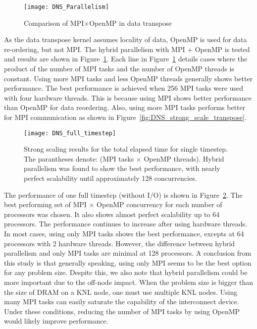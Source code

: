 \begin{figure}
 \begin{center}
   \texttt{[image: DNS\_Parallelism]}
   \caption{Comparison of MPI$\times$OpenMP in data transpose}
   \label{fig:DNS_MPI_OpenMP}
 \end{center}
\end{figure}


As the data transpose kernel assumes locality of data, OpenMP is used
for data re-ordering, but not MPI. The hybrid parallelism with MPI + OpenMP
is tested and results are shown in Figure~\ref{fig:DNS_MPI_OpenMP}. 
Each line in Figure~\ref{fig:DNS_MPI_OpenMP} details cases where the product of
the number of MPI tasks and the number of OpenMP threads is
constant. Using more MPI tasks and less OpenMP threads generally shows
better performance. The best performance is achieved when 256 MPI tasks
were used with four hardware threads. This is because using MPI shows
better performance than OpenMP for data reordering. Also, using more MPI
tasks performs better for MPI communication as shown in
Figure~\ref{fig:DNS_strong_scale_transpose}. 


\begin{figure}
 \begin{center}
   \texttt{[image: DNS\_full\_timestep]}
   \caption{Strong scaling results for the total elapsed time for single timestep. The parantheses denote: (MPI tasks $\times$ OpenMP threads). Hybrid parallelism was found to show the best performance, with nearly perfect scalability until approximately 128 concurrencies.}
   \label{fig:DNS_strong_scale_total_elapsed_time}
 \end{center}
\end{figure}

The performance of one full timestep (without I/O) is shown in
Figure~\ref{fig:DNS_strong_scale_total_elapsed_time}. The best
performing set of MPI $\times$ OpenMP concurrency for each number of 
processors was chosen. It also shows almost perfect scalability up to 64
processors. The performance continues to increase after using hardware
threads. In most cases, using only MPI tasks shows the best performance, 
excepts at 64 processors with 2 hardware threads. However, the
difference between hybrid parallelism and only MPI tasks are minimal at
128 processors. A conclusion from this study is that generally speaking, 
using only MPI seems to be the best option for any problem size. 
Despite this, we also note that hybrid parallelism could be more 
important due to the off-node impact. When the problem size
is bigger than the size of DRAM on a KNL node, one must use multiple KNL
nodes. Using many MPI tasks can easily saturate the capability of
the interconnect device. Under these conditions, reducing the number of MPI tasks
by using OpenMP would likely improve performance.   

